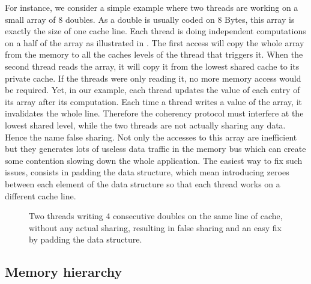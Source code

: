 For instance, we  consider a simple example where two threads are working on a small array of $8$ doubles.
As a double is usually coded on $8$ Bytes, this array is exactly the size of one cache line.
Each thread is doing independent computations on a half of the array as illustrated in .
The first access will copy the whole array from the memory to all the caches levels of the thread that triggers it.
When the second thread reads the array, it will copy it from the lowest shared cache to its private cache.
If the threads were only reading it, no more memory access would be required.
Yet, in our example, each thread updates the value of each entry of its array after its computation.
Each time a thread writes a value of the array, it invalidates the whole line.
Therefore the coherency protocol must interfere at the lowest shared level, while the two threads are not actually sharing any data.
Hence the name false sharing.
Not only the accesses to this array are inefficient but they generates lots of useless data traffic in the memory bus which can create some contention slowing down the whole application.
The easiest way to fix such issues, consists in padding the data structure, which mean introducing zeroes between each element of the data structure so that each thread works on a different cache line.

\begin{figure}[htb]
    \centering
    
    \caption[Example of false sharing.]{Two threads writing 4 consecutive doubles on the same line of cache, without any actual sharing, resulting in false sharing and an easy fix by padding the data structure.}
    \label{fig:false-sharing}
\end{figure}

\subsection{Memory hierarchy}

